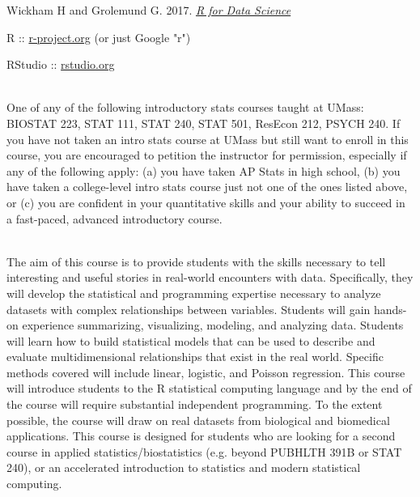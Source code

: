 \documentclass[10pt]{article}
\begin{document}
Wickham H and Grolemund G. 2017. \emph{\href{https://r4ds.had.co.nz/index.html}{R for Data Science}}


{}

R :: \href{http://www.r-project.org}{r-project.org} (or just Google "r")

RStudio :: \href{http://www.rstudio.org}{rstudio.org}


\bigskip
{}\\
One of any of the following introductory stats courses taught at UMass: BIOSTAT 223, STAT 111, STAT 240, STAT 501, ResEcon 212, PSYCH 240. If you have not taken an intro stats course at UMass but still want to enroll in this course, you are encouraged to petition the instructor for permission, especially if any of the following apply: (a) you have taken AP Stats in high school, (b) you have taken a college-level intro stats course just not one of the ones listed above, or (c) you are confident in your quantitative skills and your ability to succeed in a fast-paced, advanced introductory course.


\bigskip
{}\\
The aim of this course is to provide students with the skills necessary to tell interesting and useful stories in real-world encounters with data. Specifically, they will develop the statistical and programming expertise necessary to analyze datasets with complex relationships between variables. Students will gain hands-on experience summarizing, visualizing, modeling, and analyzing data. Students will learn how to build statistical models that can be used to describe and evaluate multidimensional relationships that exist in the real world. Specific methods covered will include linear, logistic, and Poisson regression. This course will introduce students to the R statistical computing language and by the end of the course will require substantial independent programming. To the extent possible, the course will draw on real datasets from biological and biomedical applications. This course is designed for students who are looking for a second course in applied statistics/biostatistics (e.g. beyond PUBHLTH 391B or STAT 240), or an accelerated introduction to statistics and modern statistical computing.
\end{document}
